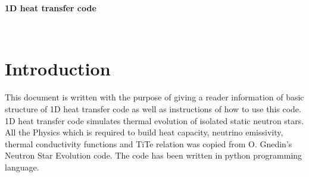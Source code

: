 \documentclass[preprint,pre,floats,aps,amsmath,amssymb]{revtex4}
\begin{document}
\begin{minipage}[h]{\textwidth}
 \begin{center}
 \textbf{\large{1D heat transfer code}} 
\end{center}
\end{minipage}
\\

\section{Introduction}
This document is written with the purpose of giving a reader information of basic structure of 1D heat transfer code as well as instructions of how to use this code. 1D heat transfer code simulates thermal evolution of isolated static neutron stars. All the Physics which is required to build heat capacity, neutrino emissivity, thermal conductivity functions and TiTe relation was copied from O. Gnedin's Neutron Star Evolution code. The code has
been written in python programming language.
\end{document}
